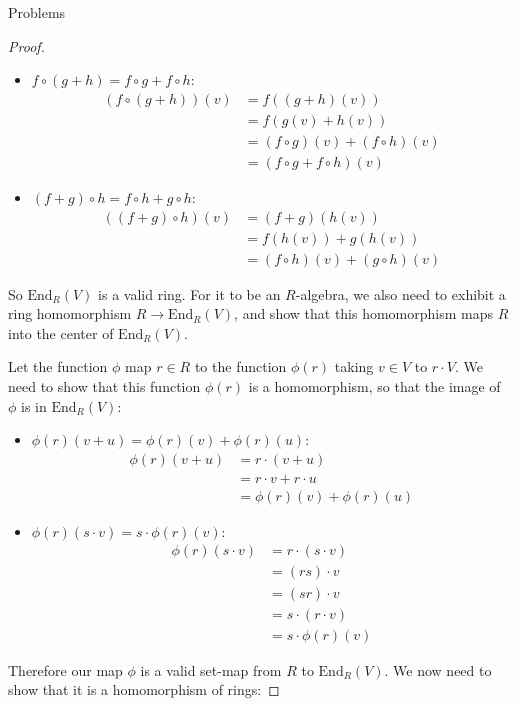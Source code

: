 \documentclass[12pt]{article}
\theoremstyle{definition}
\begin{document}
\begin{section}{Problems}
\begin{proof}
		\begin{itemize}
			\item $f \circ (g + h) = f \circ g + f \circ h$:
				\begin{align*}
					(f \circ (g + h))(v) &= f( (g + h)(v))\\
					&= f(g(v) + h(v))\\
					&= (f \circ g)(v) + (f \circ h)(v)\\
					&= (f \circ g + f \circ h)(v)
				\end{align*}
			\item $(f + g) \circ h = f \circ h + g \circ h$:
				\begin{align*}
					( (f + g) \circ h)(v) &= (f+g)(h(v))\\
					&= f( h(v)) + g(h(v))\\
					&= (f \circ h)(v) + (g \circ h)(v)
				\end{align*}
		\end{itemize}
		So $\text{End}_R(V)$ is a valid ring. For it to be an $R$-algebra, we also need to exhibit a ring homomorphism $R \to \text{End}_R(V) $, and show that this homomorphism maps $R$ into the center of $\text{End}_R(V)$. 
		\par Let the function $\phi$ map $r \in R$ to the function $\phi(r)$ taking $v \in V$ to $r \cdot V$. We need to show that this function $\phi(r)$ is a homomorphism, so that the image of $\phi$ is in $\text{End}_R(V)$:
		\begin{itemize}
			\item $\phi(r)(v + u) = \phi(r)(v) + \phi(r)(u)$:
				\begin{align*}
					\phi(r)(v+u) &= r \cdot (v + u)\\
					&= r \cdot v + r \cdot u\\
					&= \phi(r)(v) + \phi(r)(u)
				\end{align*}
			\item $\phi(r)(s \cdot v) = s \cdot \phi(r)(v)$:
				\begin{align*}
					\phi(r)(s \cdot v) &= r \cdot (s \cdot v)\\
					&= (rs) \cdot v\\
					&= (sr) \cdot v\\
					&= s \cdot (r \cdot v)\\
					&= s \cdot \phi(r)(v)
				\end{align*}
		\end{itemize}
		Therefore our map $\phi$ is a valid set-map from $R$ to $\text{End}_R(V)$. We now need to show that it is a homomorphism of rings:

\end{proof}
\end{section}
\end{document}
